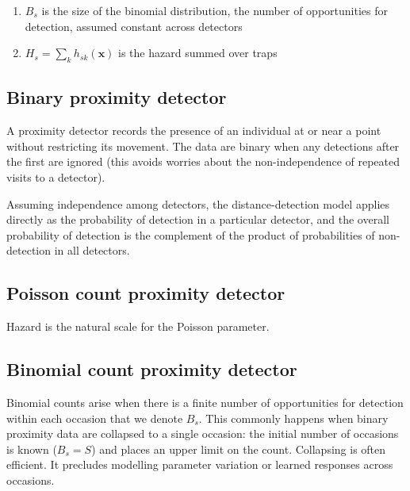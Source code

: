 \documentclass[
]{book}
\providecommand{\tightlist}{%
  \setlength{\itemsep}{0pt}\setlength{\parskip}{0pt}}
\begin{document}
\begin{enumerate}
\def\labelenumi{\arabic{enumi}.}
\tightlist
\item
  \(B_s\) is the size of the binomial distribution, the number of opportunities for detection, assumed constant across detectors
\item
  \(H_s = \sum_k h_{sk}(\mathbf{x})\) is the hazard summed over traps
\end{enumerate}

\subsection{Binary proximity detector}\label{binary-proximity-detector}


A proximity detector records the presence of an individual at or near a point without restricting its movement. The data are binary when any detections after the first are ignored (this avoids worries about the non-independence of repeated visits to a detector).

Assuming independence among detectors, the distance-detection model applies directly as the probability of detection in a particular detector, and the overall probability of detection is the complement of the product of probabilities of non-detection in all detectors.

\subsection{Poisson count proximity detector}\label{poisson-count-proximity-detector}


Hazard is the natural scale for the Poisson parameter.

\subsection{Binomial count proximity detector}\label{binomial-count-proximity-detector}


Binomial counts arise when there is a finite number of opportunities for detection within each occasion that we denote \(B_s\). This commonly happens when binary proximity data are collapsed to a single occasion: the initial number of occasions is known (\(B_s = S\)) and places an upper limit on the count. Collapsing is often efficient. It precludes modelling parameter variation or learned responses across occasions.
\end{document}
